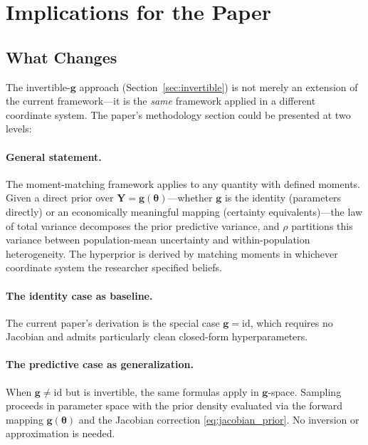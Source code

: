 \documentclass[11pt,a4paper]{article}
\theoremstyle{definition}
\newcommand{\btheta}{\boldsymbol{\theta}}
\begin{document}
\section{Implications for the Paper}

\subsection{What Changes}

The invertible-$\mathbf{g}$ approach (Section~\ref{sec:invertible}) is not
merely an extension of the current framework---it is the \emph{same} framework
applied in a different coordinate system. The paper's methodology section could
be presented at two levels:

\paragraph{General statement.} The moment-matching framework applies to any
quantity with defined moments. Given a direct prior over $\mathbf{Y} =
\mathbf{g}(\btheta)$---whether $\mathbf{g}$ is the identity (parameters
directly) or an economically meaningful mapping (certainty equivalents)---the
law of total variance decomposes the prior predictive variance, and $\rho$
partitions this variance between population-mean uncertainty and
within-population heterogeneity. The hyperprior is derived by matching moments
in whichever coordinate system the researcher specified beliefs.

\paragraph{The identity case as baseline.} The current paper's derivation is
the special case $\mathbf{g} = \text{id}$, which requires no Jacobian and
admits particularly clean closed-form hyperparameters.

\paragraph{The predictive case as generalization.} When
$\mathbf{g} \neq \text{id}$ but is invertible, the same formulas apply in
$\mathbf{g}$-space. Sampling proceeds in parameter space with the prior density
evaluated via the forward mapping $\mathbf{g}(\btheta)$ and the Jacobian
correction \eqref{eq:jacobian_prior}. No inversion or approximation is needed.
\end{document}
